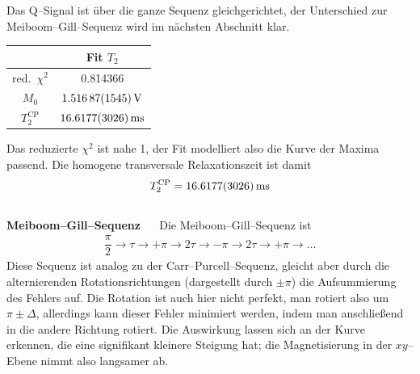 \documentclass[10pt]{article}
\newenvironment{Figure}
  {\par\medskip\noindent\minipage{\linewidth}}
  {\endminipage\par\medskip}
\begin{document}
\begin{multicols}{2}
Das Q--Signal ist über die ganze Sequenz gleichgerichtet, der Unterschied zur Meiboom--Gill--Sequenz wird im nächsten Abschnitt klar.
  \begin{Figure}
    \centering\resizebox{\textwidth}{!}{}
    \label{fig:cp}
  \end{Figure}
  \begin{center}
    \begin{tabular}{c|c}
    & Fit $T_2$\\
    \hline
    red.\ $\chi ^2$ & 0.814366\\
    $M_0$ & $\SI{1.51687+-0.01545}{V}$ \\
    $T_2^{\text{CP}}$ & $\SI{16.6177+-0.3026}{ms}$ 
    \end{tabular}
  \label{Tab:mg_para}
  \end{center}
Das reduzierte $\chi ^2$ ist nahe 1, der Fit modelliert also die Kurve der Maxima passend.
Die homogene transversale Relaxationszeit ist damit
\begin{align} 
        T_2^{\text{CP}}=\SI{16.6177+-0.3026}{ms}
\end{align} 
\\\textbf{Meiboom--Gill--Sequenz} $\quad$ 
Die Meiboom--Gill--Sequenz ist 
\begin{align} 
        \dfrac{\pi }{2}\rightarrow \tau \rightarrow +\pi \rightarrow 2\tau \rightarrow -\pi \rightarrow 2\tau \rightarrow +\pi \rightarrow \hdots 
\end{align} 
Diese Sequenz ist analog zu der Carr--Purcell--Sequenz, gleicht aber durch die alternierenden Rotationsrichtungen (dargestellt durch $\pm \pi $) die Aufsummierung des Fehlers auf.
Die Rotation ist auch hier nicht perfekt, man rotiert also um $\pi \pm \Delta $, allerdings kann dieser Fehler minimiert werden, indem man anschließend in die andere Richtung rotiert.
Die Auswirkung lassen sich an der Kurve erkennen, die eine signifikant kleinere Steigung hat; die Magnetisierung in der $xy$--Ebene nimmt also langsamer ab.


\end{multicols}
\end{document}
